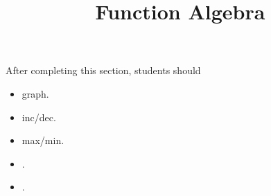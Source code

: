 \documentclass{ximera}
\title{Function Algebra}
\begin{document}
\begin{abstract}

\end{abstract}
\maketitle

\begin{sectionOutcomes}
After completing this section, students should 

\begin{itemize}
\item graph.
\item inc/dec.
\item max/min.
\item .
\item .
\end{itemize}
\end{sectionOutcomes}
\end{document}
